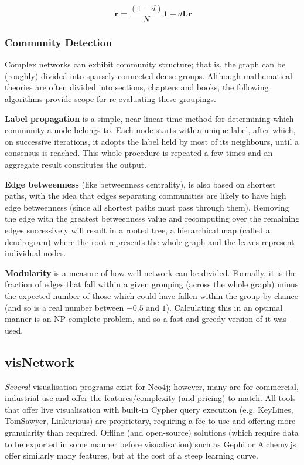 \begin{equation}~\label{eqn:pagerank}
  \mathbf{r} = \frac{\left(1-d\right)}{N} \mathbf{1} + d\mathbf{Lr}
\end{equation}

\subsubsection{Community Detection}

Complex networks can exhibit community structure; that is, the graph can be
(roughly) divided into sparsely-connected dense groups. Although mathematical
theories are often divided into sections, chapters and books, the following
algorithms provide scope for re-evaluating these groupings.

\textbf{Label propagation} is a simple, near linear time method for
determining which community a node belongs to. Each node starts with a unique
label, after which, on successive iterations, it adopts the label held by most
of its neighbours, until a consensus is reached. This whole procedure is
repeated a few times and an aggregate result constitutes the
output.~\cite{raghavan2007}

\textbf{Edge betweenness} (like betweenness centrality), is also based on
shortest paths, with the idea that edges separating communities are likely to
have high edge betweenness (since all shortest paths must pass through them).
Removing the edge with the greatest betweenness value and recomputing over the
remaining edges successively will result in a rooted tree, a hierarchical map
(called a dendrogram) where the root represents the whole graph and the leaves
represent individual nodes.~\cite{newman2004}

\textbf{Modularity} is a measure of how well network can be divided.
Formally, it is the fraction of edges that fall within a given grouping
(across the whole graph) minus the expected number of those which could have
fallen within the group by chance (and so is a real number between $-0.5$ and
$1$). Calculating this in an optimal manner is an NP-complete problem, and so
a fast and greedy version of it was used.~\cite{clauset2004}

\subsection{visNetwork}

\emph{Several} visualisation programs exist for Neo4j; however, many are for
commercial, industrial use and offer the features/complexity (and pricing) to
match. All tools that offer live visualisation with built-in Cypher query
execution (e.g. KeyLines, TomSawyer, Linkurious) are proprietary, requiring a
fee to use and offering more granularity than required. Offline (and
open-source) solutions (which require data to be exported in some manner before
visualisation) such as Gephi or Alchemy.js offer similarly many features, but at
the cost of a steep learning curve. 

